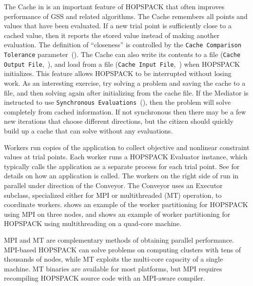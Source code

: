 The Cache in  is an important feature of
HOPSPACK that often improves performance of GSS and related algorithms.
The Cache remembers all points and values that have been evaluated.  If a new
trial point is sufficiently close to a cached value, then it reports the stored
value instead of making another evaluation.  The definition of ``closeness''
is controlled by the
{\tt Cache Comparison Tolerance} parameter~().
The Cache can also write its contents to a file
({\tt Cache Output File},~), and load from
a file ({\tt Cache Input File},~)
when HOPSPACK initializes.
This feature allows HOPSPACK to be interrupted without losing work.
As an interesting exercise, try solving a problem and saving the cache to a file,
and then solving again after initializing from the cache file.
If the Mediator is instructed to use
{\tt Synchronous Evaluations}~(), then the problem
will solve completely from cached information.
If not synchronous then there may be a few new iterations that choose different
directions, but the citizen should quickly build up a cache that can
solve without any evaluations.

Workers run copies of the application to collect objective and nonlinear
constraint values at trial points.  Each worker runs a HOPSPACK Evaluator
instance, which typically calls the application as a separate process for
each trial point.  See  for details on how an application
is called.
The workers on the right side of  run in
parallel under direction of the Conveyor.  The Conveyor uses an Executor
subclass, specialized either for MPI or multithreaded (MT) operation, to
coordinate workers.
 shows an example of the worker partitioning for
HOPSPACK using MPI on three nodes, and  shows an
example of worker partitioning for HOPSPACK using multithreading on a
quad-core machine.


MPI and MT are complementary methods of obtaining parallel
performance.  MPI-based HOPSPACK can solve problems on computing clusters with
tens of thousands of nodes, while MT exploits the multi-core capacity of
a single machine.  MT binaries are available for most platforms, but 
MPI requires recompiling HOPSPACK source code with an
MPI-aware compiler.  


